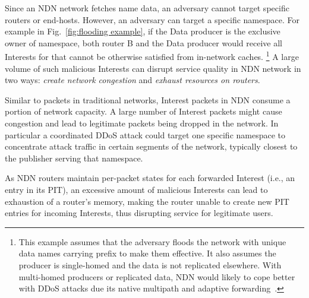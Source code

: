 Since an NDN network fetches name data, an adversary cannot target specific routers or end-hosts.
However, an adversary can target a specific namespace.
For example in Fig.~\ref{fig:flooding example}, if the Data producer is the exclusive owner of  namespace, both router B and the Data producer would receive all Interests for  that cannot be otherwise satisfied from in-network caches.%
\footnote {This example assumes that the adversary floods the network with unique data names carrying  prefix to make them effective. It also assumes the producer is single-homed and the data is not replicated elsewhere. With multi-homed producers or replicated data, NDN would likely to cope better with DDoS attacks due its native multipath and adaptive forwarding~\cite{adaptive-forwarding}.}
A large volume of such malicious Interests can disrupt service quality in NDN network in two ways: \emph{create network congestion} and \emph{exhaust resources on routers}.

Similar to packets in traditional networks, Interest packets in NDN consume a portion of network capacity. A large number of Interest packets might cause congestion and lead to legitimate packets being dropped in the network. In particular a coordinated DDoS attack could target one specific namespace to concentrate attack traffic in certain segments of the network, typically closest to the publisher serving that namespace.

As NDN routers maintain per-packet states for each forwarded Interest (i.e., an entry in its PIT), an excessive amount of malicious Interests can lead to exhaustion of a router's memory, making the router unable to create new PIT entries for incoming Interests, thus disrupting service for legitimate users.




